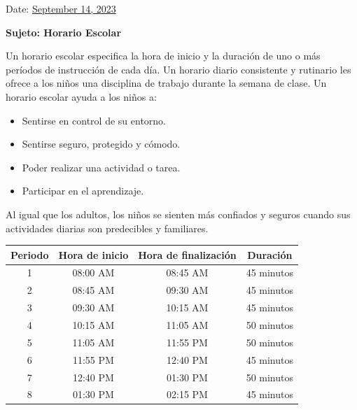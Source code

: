 \documentclass[12pt,letterpaper]{article}
\begin{document}
\vspace*{0.5in}
Date: \href{https://www.ps192.org/apps/bbmessages/show_bbm.jsp?REC_ID=139439}{September 14, 2023} 

\textbf{Sujeto: Horario Escolar}

Un horario escolar especifica la hora de inicio y la duración de uno o más períodos de instrucción de cada día. Un horario diario consistente y rutinario
les ofrece a los niños una disciplina de trabajo durante la semana de clase. Un
horario escolar ayuda a los niños a:
\begin{itemize}
\item Sentirse en control de su entorno.
\item Sentirse seguro, protegido y cómodo.
\item Poder realizar una actividad o tarea.
\item Participar en el aprendizaje.
\end{itemize}
Al igual que los adultos, los niños se sienten más confiados y seguros cuando sus
actividades diarias son predecibles y familiares.

\begin{center}
	\LARGE
    \begin{tabular}{|c|c|c|c|}
    \hline
    \textbf{Periodo} & \textbf{Hora de inicio} & \textbf{Hora de finalización} & \textbf{Duración} \\  
    \hline
    1 & 08:00 AM & 08:45 AM & 45 minutos \\
    \hline
    2 & 08:45 AM & 09:30 AM & 45 minutos \\
    \hline
    3 & 09:30 AM & 10:15 AM & 45 minutos \\
    \hline
    4 & 10:15 AM & 11:05 AM & 50 minutos \\
    \hline
    5 & 11:05 AM & 11:55 PM & 50 minutos \\
    \hline
    6 & 11:55 PM & 12:40 PM & 45 minutos \\
    \hline
    7 & 12:40 PM & 01:30 PM & 50 minutos \\
    \hline
    8 & 01:30 PM & 02:15 PM & 45 minutos \\
    \hline
    \end{tabular}
    \end{center}
\end{document}
